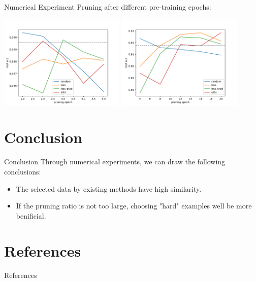 \documentclass{ctexbeamer}
\begin{document}
\begin{frame}{Numerical Experiment}
    Pruning after different pre-training epochs:
    \begin{center}
        \includegraphics[width=0.45\textwidth]{../images/mnist_pruning.pdf}
        \includegraphics[width=0.45\textwidth]{../images/cifar10_pruning.pdf}
    \end{center}
\end{frame}

\section{Conclusion}
\begin{frame}{Conclusion}
    Through numerical experiments, we can draw the following conclusions:
    \begin{itemize}
        \item The selected data by existing methods have high similarity.
        \item If the pruning ratio is not too large, choosing "hard" examples well be more benificial.
    \end{itemize}
\end{frame}

\section{References}
\begin{frame}{References}
    \printbibliography
\end{frame}
\end{document}
